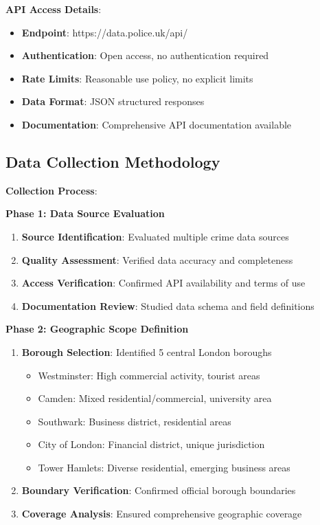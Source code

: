 \documentclass[12pt,a4paper]{article}
\begin{document}
\textbf{API Access Details}:
\begin{itemize}
    \item \textbf{Endpoint}: https://data.police.uk/api/
    \item \textbf{Authentication}: Open access, no authentication required
    \item \textbf{Rate Limits}: Reasonable use policy, no explicit limits
    \item \textbf{Data Format}: JSON structured responses
    \item \textbf{Documentation}: Comprehensive API documentation available
\end{itemize}

\subsection{Data Collection Methodology}

\textbf{Collection Process}:

\textbf{Phase 1: Data Source Evaluation}
\begin{enumerate}
    \item \textbf{Source Identification}: Evaluated multiple crime data sources
    \item \textbf{Quality Assessment}: Verified data accuracy and completeness
    \item \textbf{Access Verification}: Confirmed API availability and terms of use
    \item \textbf{Documentation Review}: Studied data schema and field definitions
\end{enumerate}

\textbf{Phase 2: Geographic Scope Definition}
\begin{enumerate}
    \item \textbf{Borough Selection}: Identified 5 central London boroughs
    \begin{itemize}
        \item Westminster: High commercial activity, tourist areas
        \item Camden: Mixed residential/commercial, university area
        \item Southwark: Business district, residential areas
        \item City of London: Financial district, unique jurisdiction
        \item Tower Hamlets: Diverse residential, emerging business areas
    \end{itemize}
    \item \textbf{Boundary Verification}: Confirmed official borough boundaries
    \item \textbf{Coverage Analysis}: Ensured comprehensive geographic coverage
\end{enumerate}
\end{document}
